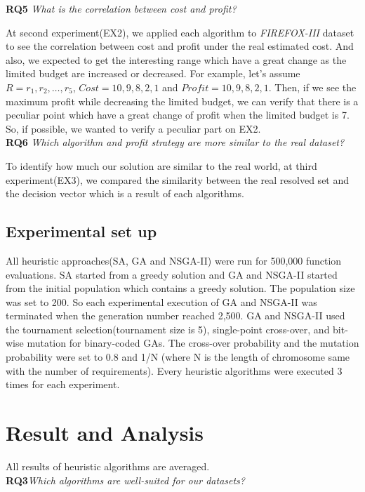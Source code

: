 \textbf{RQ5} \textit{What is the correlation between cost and profit?}

At second experiment(EX2), we applied each algorithm to \textit{FIREFOX-III} dataset to see the correlation between cost and profit under the real estimated cost. And also, we expected to get the interesting range which have a great change as the limited budget are increased or decreased. For example, let's assume $R = {r_1, r_2, \ldots, r_5}$, $Cost = {10, 9, 8, 2, 1}$ and $Profit = {10, 9, 8, 2, 1}$. Then, if we see the maximum profit while decreasing the limited budget, we can verify that there is a peculiar point which have a great change of profit when the limited budget is 7. So, if possible, we wanted to verify a peculiar part on EX2.
\\

\textbf{RQ6} \textit{Which algorithm and profit strategy are more similar to the real dataset?}

To identify how much our solution are similar to the real world, at third experiment(EX3), we compared the similarity between the real resolved set and the decision vector which is a result of each algorithms.\\ 

\subsection{Experimental set up}
All heuristic approaches(SA, GA and NSGA-II) were run for 500,000 function evaluations. SA started from a greedy solution and GA and NSGA-II started from the initial population which contains a greedy solution. The population size was set to 200. So each experimental execution of GA and NSGA-II was terminated when the generation number reached 2,500. GA and NSGA-II used the tournament selection(tournament size is 5), single-point cross-over, and bit-wise mutation for binary-coded GAs. The cross-over probability and the mutation probability were set to 0.8 and 1/N (where N is the length of chromosome same with the number of requirements). Every heuristic algorithms were executed 3 times for each experiment.



\section{Result and Analysis}
All results of heuristic algorithms are averaged.\\

\textbf{RQ3}\textit{Which algorithms are well-suited for our datasets?}

